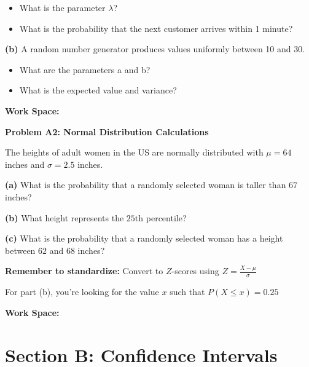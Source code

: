 \documentclass[
  11pt,
]{article}
\providecommand{\tightlist}{%
  \setlength{\itemsep}{0pt}\setlength{\parskip}{0pt}}
\begin{document}
\begin{itemize}
\tightlist
\item
  What is the parameter \(\lambda\)?
\item
  What is the probability that the next customer arrives within 1
  minute?
\end{itemize}

\textbf{(b)} A random number generator produces values uniformly between
10 and 30.

\begin{itemize}
\tightlist
\item
  What are the parameters a and b?
\item
  What is the expected value and variance?
\end{itemize}

\textbf{Work Space:}

\textbf{Problem A2: Normal Distribution Calculations}

The heights of adult women in the US are normally distributed with
\(\mu = 64\) inches and \(\sigma = 2.5\) inches.

\textbf{(a)} What is the probability that a randomly selected woman is
taller than \(67\) inches?

\textbf{(b)} What height represents the \(25\)th percentile?

\textbf{(c)} What is the probability that a randomly selected woman has
a height between \(62\) and \(68\) inches?

\begin{tcolorbox}[enhanced jigsaw, toprule=.15mm, colbacktitle=quarto-callout-tip-color!10!white, colback=white, toptitle=1mm, colframe=quarto-callout-tip-color-frame, bottomrule=.15mm, title=\textcolor{quarto-callout-tip-color}{\faLightbulb}\hspace{0.5em}{Tip}, left=2mm, opacitybacktitle=0.6, bottomtitle=1mm, coltitle=black, titlerule=0mm, breakable, arc=.35mm, opacityback=0, rightrule=.15mm, leftrule=.75mm]

\textbf{Remember to standardize:} Convert to \(Z\)-scores using
\(Z = \frac{X - \mu}{\sigma}\)

For part (b), you're looking for the value \(x\) such that
\(P(X ≤ x) = 0.25\)

\end{tcolorbox}

\textbf{Work Space:}

\section{Section B: Confidence
Intervals}\label{section-b-confidence-intervals}
\end{document}
